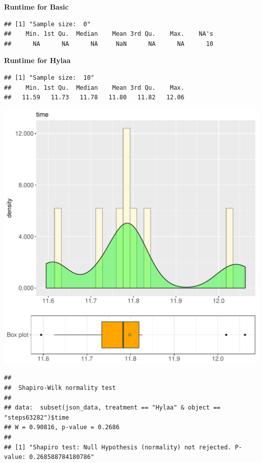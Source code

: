 \documentclass{article}\usepackage[]{graphicx}\usepackage[]{color}
\makeatletter
\def\maxwidth{ %
  \ifdim\Gin@nat@width>\linewidth
    \linewidth
  \else
    \Gin@nat@width
  \fi
}
\newenvironment{kframe}{%
 \def\at@end@of@kframe{}%
 \ifinner\ifhmode%
  \def\at@end@of@kframe{\end{minipage}}%
  \begin{minipage}{\columnwidth}%
 \fi\fi%
 \def\FrameCommand##1{\hskip\@totalleftmargin \hskip-\fboxsep
 \colorbox{shadecolor}{##1}\hskip-\fboxsep
     \hskip-\linewidth \hskip-\@totalleftmargin \hskip\columnwidth}%
 \MakeFramed {\advance\hsize-\width
   \@totalleftmargin\z@ \linewidth\hsize
   \@setminipage}}%
 {\par\unskip\endMakeFramed%
 \at@end@of@kframe}
\newenvironment{knitrout}{}{} %
\makeatother
\begin{document}
 \textbf{Runtime for Basic}
\begin{knitrout}
\color{fgcolor}\begin{kframe}
\begin{verbatim}
## [1] "Sample size:  0"
##    Min. 1st Qu.  Median    Mean 3rd Qu.    Max.    NA's 
##      NA      NA      NA     NaN      NA      NA      10
\end{verbatim}
\end{kframe}
\end{knitrout}
 \textbf{Runtime for Hylaa}
\begin{knitrout}
\color{fgcolor}\begin{kframe}
\begin{verbatim}
## [1] "Sample size:  10"
##    Min. 1st Qu.  Median    Mean 3rd Qu.    Max. 
##   11.59   11.73   11.78   11.80   11.82   12.06
\end{verbatim}
\end{kframe}
\includegraphics[width=\maxwidth]{figure/RH3_Hylaa_steps63282-1} 
\begin{kframe}\begin{verbatim}
## 
## 	Shapiro-Wilk normality test
## 
## data:  subset(json_data, treatment == "Hylaa" & object == "steps63282")$time
## W = 0.90816, p-value = 0.2686
## 
## [1] "Shapiro test: Null Hypothesis (normality) not rejected. P-value: 0.268588784180786"
\end{verbatim}
\end{kframe}
\end{knitrout}
  
\end{document}
